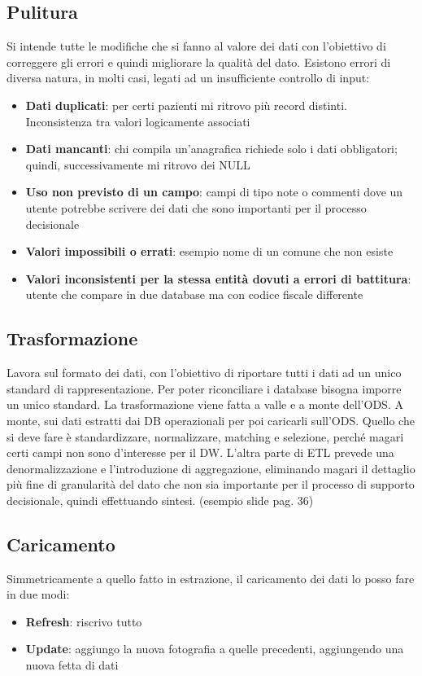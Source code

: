 \subsection{Pulitura}
Si intende tutte le modifiche che si fanno al valore dei dati con l’obiettivo di correggere gli errori e quindi migliorare la qualità del dato. Esistono errori di diversa natura, in molti casi, legati ad un insufficiente controllo di input:
\begin{itemize}
	\item
	\textbf{Dati duplicati}: per certi pazienti mi ritrovo più record distinti. Inconsistenza tra valori logicamente associati
	\item
	\textbf{Dati mancanti}: chi compila un’anagrafica richiede solo i dati obbligatori; quindi, successivamente mi ritrovo dei NULL
	\item
	\textbf{Uso non previsto di un campo}: campi di tipo note o commenti dove un utente potrebbe scrivere dei dati che sono importanti per il processo decisionale
	\item
	\textbf{Valori impossibili o errati}: esempio nome di un comune che non esiste
	\item 	
	\textbf{Valori inconsistenti per la stessa entità dovuti a errori di battitura}: utente che compare in due database ma con codice fiscale differente
\end{itemize}
\subsection{Trasformazione}
Lavora sul formato dei dati, con l’obiettivo di riportare tutti i dati ad un unico standard di rappresentazione. Per poter riconciliare i database bisogna imporre un unico standard. La trasformazione viene fatta a valle e a monte dell’ODS. A monte, sui dati estratti dai DB operazionali per poi caricarli sull’ODS. Quello che si deve fare è standardizzare, normalizzare, matching e selezione, perché magari certi campi non sono d’interesse per il DW. L’altra parte di ETL prevede una denormalizzazione e l’introduzione di aggregazione, eliminando magari il dettaglio più fine di granularità del dato che non sia importante per il processo di supporto decisionale, quindi effettuando sintesi. (esempio slide pag. 36)
\subsection{Caricamento}
Simmetricamente a quello fatto in estrazione, il caricamento dei dati lo posso fare in due modi:
\begin{itemize}
	\item 
	\textbf{Refresh}: riscrivo tutto 
	\item 
	\textbf{Update}: aggiungo la nuova fotografia a quelle precedenti, aggiungendo una nuova fetta di dati
\end{itemize}